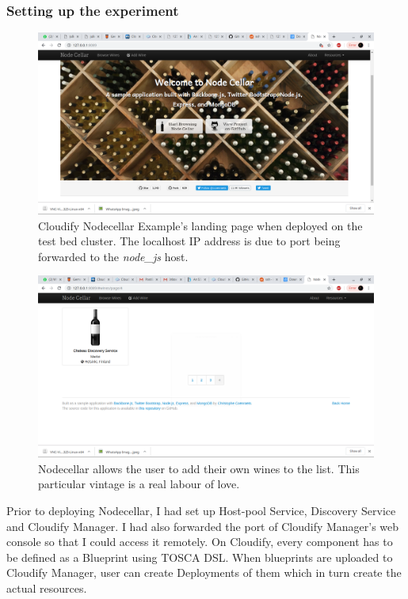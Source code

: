 \subsubsection*{Setting up the experiment}


 \begin{figure}[ht!]
\centering
  \includegraphics[width=\textwidth, keepaspectratio]{Nodecellarscreenshot.png}%
  \caption{Cloudify Nodecellar Example's landing page when deployed on the test bed cluster. The localhost IP address is due to port being forwarded to the \textit{node\_js} host.}
  \label{fig:nodecellar}
\end{figure}

 \begin{figure}[ht!]
\centering
  \includegraphics[width=\textwidth, keepaspectratio]{chateaudiscoveryservice.png}%
  \caption{Nodecellar allows the user to add their own wines to the list. This particular vintage is a real labour of love.}
  \label{fig:chateau}
\end{figure}

Prior to deploying Nodecellar, I had set up Host-pool Service, Discovery Service and Cloudify Manager. I had also forwarded the port of Cloudify Manager's web console so that I could access it remotely. On Cloudify, every component has to be defined as a Blueprint using TOSCA DSL. When blueprints are uploaded to Cloudify Manager, user can create Deployments of them which in turn create the actual resources.

